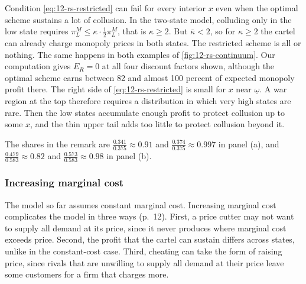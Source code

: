 \begin{remark}\label{rem:12-rs-restricted}
Condition \eqref{eq:12-rs-restricted} can fail for every interior $x$ even when the optimal scheme sustains a lot of
collusion. In the two-state model, colluding only in the low state requires $\pi_L^M \le \kappa\cdot\frac{1}{2}\pi_L^M$,
that is $\kappa \ge 2$. But $\bar\kappa < 2$, so for $\kappa \ge 2$ the cartel can already charge monopoly prices in
both states. The restricted scheme is all or nothing. The same happens in both examples of \cref{fig:12-rs-continuum}.
Our computation gives $E_R = 0$ at all four discount factors shown, although the optimal scheme earns between 82 and
almost 100 percent of expected monopoly profit there. The right side of \eqref{eq:12-rs-restricted} is small for $x$ near
$\underline\omega$. A war region at the top therefore requires a distribution in which very high states are rare. Then
the low states accumulate enough profit to protect collusion up to some $x$, and the thin upper tail adds too little
to protect collusion beyond it.
\end{remark}

The shares in the remark are $\frac{0.341}{0.375} \approx 0.91$ and $\frac{0.374}{0.375} \approx 0.997$ in panel (a), and
$\frac{0.479}{0.583} \approx 0.82$ and $\frac{0.573}{0.583} \approx 0.98$ in panel (b).

\subsubsection{Increasing marginal cost}

The model so far assumes constant marginal cost. Increasing marginal cost complicates the model in three ways
(p.~12). First, a price cutter may not want to supply all demand at its price, since it never produces where marginal
cost exceeds price. Second, the profit that the cartel can sustain differs across states, unlike in the constant-cost
case. Third, cheating can take the form of raising price, since rivals that are unwilling to supply all demand at
their price leave some customers for a firm that charges more.

